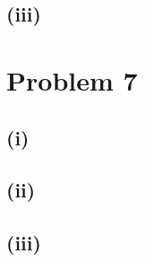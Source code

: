 \documentclass{article}
\begin{document}
\subsection*{(iii)}


\section*{Problem 7} %

\subsection*{(i)}

\subsection*{(ii)}

\subsection*{(iii)}
\end{document}
